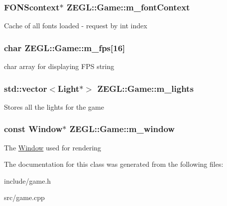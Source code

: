\subsubsection[{m\+\_\+font\+Context}]{\setlength{\rightskip}{0pt plus 5cm}F\+O\+N\+Scontext$\ast$ Z\+E\+G\+L\+::\+Game\+::m\+\_\+font\+Context\hspace{0.3cm}{\ttfamily [protected]}}\label{class_z_e_g_l_1_1_game_ab7239deb1a14053ae2d757994f2211d0}
Cache of all fonts loaded -\/ request by int index \hypertarget{class_z_e_g_l_1_1_game_ab290dd46ec4ff766bd56d0e3013bace1}{}
\subsubsection[{m\+\_\+fps}]{\setlength{\rightskip}{0pt plus 5cm}char Z\+E\+G\+L\+::\+Game\+::m\+\_\+fps\mbox{[}16\mbox{]}\hspace{0.3cm}{\ttfamily [protected]}}\label{class_z_e_g_l_1_1_game_ab290dd46ec4ff766bd56d0e3013bace1}
char array for displaying F\+P\+S string \hypertarget{class_z_e_g_l_1_1_game_ab301928901efd034fe40d53cdb54caf5}{}
\subsubsection[{m\+\_\+lights}]{\setlength{\rightskip}{0pt plus 5cm}std\+::vector$<${\bf Light}$\ast$$>$ Z\+E\+G\+L\+::\+Game\+::m\+\_\+lights\hspace{0.3cm}{\ttfamily [protected]}}\label{class_z_e_g_l_1_1_game_ab301928901efd034fe40d53cdb54caf5}
Stores all the lights for the game \hypertarget{class_z_e_g_l_1_1_game_a72107b2460cfd896337dab847801fc1c}{}
\subsubsection[{m\+\_\+window}]{\setlength{\rightskip}{0pt plus 5cm}const {\bf Window}$\ast$ Z\+E\+G\+L\+::\+Game\+::m\+\_\+window\hspace{0.3cm}{\ttfamily [protected]}}\label{class_z_e_g_l_1_1_game_a72107b2460cfd896337dab847801fc1c}
The \hyperlink{class_z_e_g_l_1_1_window}{Window} used for rendering 

The documentation for this class was generated from the following files\+:\begin{DoxyCompactItemize}
\item 
include/game.\+h\item 
src/game.\+cpp\end{DoxyCompactItemize}
